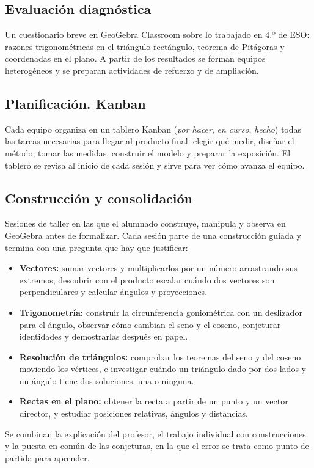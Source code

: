 \documentclass[11pt,a4paper]{article}
\begin{document}
\subsection{Evaluación diagnóstica}
Un cuestionario breve en GeoGebra Classroom sobre lo trabajado en 4.º de ESO:
razones trigonométricas en el triángulo rectángulo, teorema de Pitágoras y
coordenadas en el plano. A partir de los resultados se forman equipos
heterogéneos y se preparan actividades de refuerzo y de ampliación.

\subsection{Planificación. Kanban}
Cada equipo organiza en un tablero Kanban (\emph{por hacer}, \emph{en
curso}, \emph{hecho}) todas las tareas necesarias para llegar al producto
final: elegir qué medir, diseñar el método, tomar las medidas, construir el
modelo y preparar la exposición. El tablero se revisa al inicio de cada
sesión y sirve para ver cómo avanza el equipo.

\subsection{Construcción y consolidación}
Sesiones de taller en las que el alumnado construye, manipula y observa en
GeoGebra antes de formalizar. Cada sesión parte de una construcción guiada y
termina con una pregunta que hay que justificar:
\begin{itemize}
  \item \textbf{Vectores:} sumar vectores y multiplicarlos por un número
    arrastrando sus extremos; descubrir con el producto escalar cuándo dos
    vectores son perpendiculares y calcular ángulos y proyecciones.
  \item \textbf{Trigonometría:} construir la circunferencia goniométrica con
    un deslizador para el ángulo, observar cómo cambian el seno y el coseno,
    conjeturar identidades y demostrarlas después en papel.
  \item \textbf{Resolución de triángulos:} comprobar los teoremas del seno y
    del coseno moviendo los vértices, e investigar cuándo un triángulo dado
    por dos lados y un ángulo tiene dos soluciones, una o ninguna.
  \item \textbf{Rectas en el plano:} obtener la recta a partir de un punto y
    un vector director, y estudiar posiciones relativas, ángulos y distancias.
\end{itemize}
Se combinan la explicación del profesor, el trabajo individual con
construcciones y la puesta en común de las conjeturas, en la que el error se
trata como punto de partida para aprender.
\end{document}
